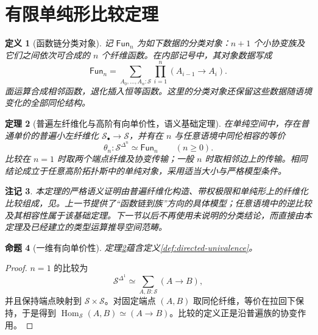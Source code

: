 \documentclass[12pt,oneside,openany,fontset=none]{ctexbook}
\theoremstyle{cn}
\newtheorem{definition}{定义}[chapter]
\newtheorem{proposition}[definition]{命题}
\newtheorem{theorem}[definition]{定理}
\newtheorem{remark}[definition]{注记}
\numberwithin{equation}{chapter}
\newcommand{\Sp}{\mathcal S}
\newcommand{\Hom}{\operatorname{Hom}}
\begin{document}
\section{有限单纯形比较定理}
\begin{definition}[函数链分类对象]
记 $\mathsf{Fun}_n$ 为如下数据的分类对象：$n+1$ 个小协变族及它们之间依次可合成的 $n$ 个纤维函数。在内部记号中，其对象数据写成
\[
\mathsf{Fun}_n=
\sum_{A_0,\ldots,A_n:\Sp}
\prod_{i=1}^n(A_{i-1}\to A_i).
\]
面运算合成相邻函数，退化插入恒等函数。这里的分类对象还保留这些数据随语境变化的全部同伦结构。
\end{definition}
\begin{theorem}[普遍左纤维化与高阶有向单价性，语义基础定理]\label{thm:higher-directed}
在单纯空间中，存在普通单价的普遍小左纤维化 $\Sp_\bullet\to\Sp$，并有在 $n$ 与任意语境中同伦相容的等价
\[
\theta_n:\Sp^{\Delta^n}\simeq\mathsf{Fun}_n
\qquad(n\ge0).
\]
比较在 $n=1$ 时取两个端点纤维及协变传输；一般 $n$ 时取相邻边上的传输。相同结论成立于任意高阶拓扑斯中的单纯对象，采用适当大小与严格模型条件。
\end{theorem}
\begin{remark}
本定理的严格语义证明由普遍纤维化构造、带权极限和单纯形上的纤维化比较组成，见\cite[定理6.2.5]{CavalloRiehlSattler}。上一节提供了“函数链到族”方向的具体模型；任意语境中的逆比较及其相容性属于该基础定理。下一节以后不再使用未说明的分类结论，而直接由本定理及已经建立的类型运算推导空间范畴。
\end{remark}
\begin{proposition}[一维有向单价性]
定理\ref{thm:higher-directed}蕴含定义\ref{def:directed-univalence}。
\end{proposition}
\begin{proof}
$n=1$ 的比较为
\[
\Sp^{\Delta^1}\simeq
\sum_{A,B:\Sp}(A\to B),
\]
并且保持端点映射到 $\Sp\times\Sp$。对固定端点 $(A,B)$ 取同伦纤维，等价在拉回下保持，于是得到
$\Hom_\Sp(A,B)\simeq(A\to B)$。比较的定义正是沿普遍族的协变作用。
\end{proof}
\end{document}
